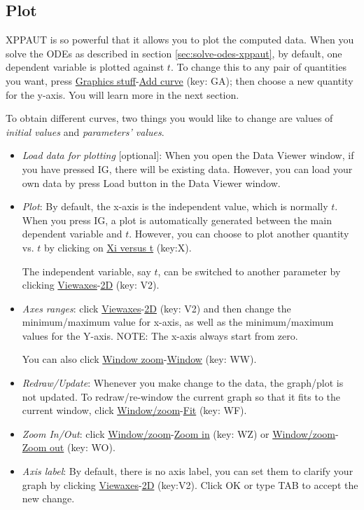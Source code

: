 \subsection{Plot}
\label{sec:plot}

XPPAUT is so powerful that it allows you to plot the computed data.
When you solve the ODEs as described in section \ref{sec:solve-odes-xppaut},
by default, one dependent variable is plotted against $t$. To change
this to any pair of quantities you want, press
\underline{Graphics stuff}-\underline{Add curve} (key: GA); then
choose a new quantity for the y-axis. You will learn more in the next
section.

To obtain different curves, two things you would like to change are
values of {\it initial values} and {\it parameters' values}.

\begin{itemize}

\item {\it Load data for plotting} [optional]: When you open the Data
  Viewer window, if you have pressed IG, there will be existing
  data. However, you can load your own data by press Load button in
  the Data Viewer window.


\item {\it Plot}: By default, the x-axis is the independent value,
  which is normally $t$. When you press IG, a plot is automatically
  generated between the main dependent variable and $t$. However, you
  can choose to plot another quantity vs. $t$ by clicking on
  \underline{Xi versus t} (key:X).

  The independent variable, say $t$, can be switched to another
  parameter by clicking \underline{Viewaxes}-\underline{2D} (key: V2).

\item {\it  Axes ranges}: click
  \underline{Viewaxes}-\underline{2D} (key: V2) and then change the
  minimum/maximum value for x-axis, as well as the minimum/maximum
  values for the Y-axis. NOTE: The x-axis always start from zero.

  You can also click \underline{Window zoom}-\underline{Window} (key: WW).

\item {\it Redraw/Update}: Whenever you make change to the data, the
  graph/plot is not updated. To redraw/re-window the current graph so
  that it fits to the current window, click
  \underline{Window/zoom}-\underline{Fit} (key: WF).

\item {\it Zoom In/Out}:  click
  \underline{Window/zoom}-\underline{Zoom in} (key: WZ) or
  \underline{Window/zoom}-\underline{Zoom out} (key: WO).


\item {\it Axis label}: By default, there is no axis label, you can set
  them to clarify your graph by clicking
  \underline{Viewaxes}-\underline{2D} (key:V2). Click OK or type TAB
  to accept the new change.

\end{itemize}


